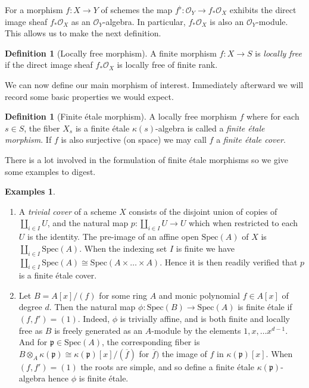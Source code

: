 \documentclass{article}
\theoremstyle{definition}
\newtheorem{definition}[theorem]{Definition}
\newtheorem{examples}[theorem]{Examples}
\theoremstyle{remark}
\theoremstyle{plain}
\newcommand{\mc}[1]{\mathcal{#1}}
\newcommand{\mk}[1]{\mathfrak{#1}}
\begin{document}
For a morphism $f: X \to Y$ of schemes the map $f^{\flat}: \mc{O}_Y \to f_*\mc{O}_X$ exhibits the direct image sheaf $f_* \mc{O}_X$ as an $\mc{O}_Y$-algebra.
In particular, $f_* \mc{O}_X$ is also an $\mc{O}_Y$-module.
This allows us to make the next definition.

\begin{definition}[Locally free morphism]	
	A finite morphism $f: X \to S$ is \textit{locally free} if the direct image sheaf $f_* \mc{O}_X$ is locally free of finite rank.   
\end{definition}

We can now define our main morphism of interest.
Immediately afterward we will record some basic properties we would expect.
\begin{definition}[Finite \'etale morphism]
	A locally free morphism $f$ where for each $s \in S$, the fiber $X_s$ is a finite \'etale $\kappa(s)$-algebra is called a \textit{finite \'etale morphism}.
	If $f$ is also surjective (on space) we may call $f$ a \textit{finite \'etale cover}.
\end{definition}

There is a lot involved in the formulation of finite \'etale morphisms so we give some examples to digest.

\begin{examples}\text{} 
	\begin{enumerate}
\item 	A \textit{trivial cover} of a scheme $X$ consists of the disjoint union of copies of $\coprod_{i \in I} U$, and the natural map $p: \coprod_{i \in I} U \to U$ which when restricted to each $U$ is the identity.
	The pre-image of an affine open $\text{Spec}(A)$ of $X$ is $\coprod_{i \in I} \text{Spec}(A)$.
	When the indexing set $I$ is finite we have $\coprod_{i \in I} \text{Spec}(A) \cong \text{Spec}(A \times \dots \times A)$.
	Hence it is then readily verified that $p$ is a finite \'etale cover.
\item  Let $B = A[x]/(f)$  for some ring $A$ and monic polynomial $f \in A[x]$ of degree $d$.
	Then the natural map $\phi: \text{Spec}(B) \to \text{Spec}(A)$ is finite \'etale if $(f, f') = (1)$.
	Indeed, $\phi$ is trivially affine, and is both finite and locally free as $B$ is freely generated as an $A$-module by the elements $1,x, \dots x^{d-1}$.
	And for $\mk{p} \in \text{Spec}(A)$, the corresponding fiber is $B \otimes_A \kappa(\mk{p}) \cong \kappa(\mk{p})[x]/(\overline{f})$ for $\overline{f})$ the image of $f$ in $\kappa(\mk{p})[x]$.
	When $(f, f') = (1)$ the roots are simple, and so define a finite \'etale $\kappa(\mk{p})$-algebra hence $\phi$ is finite \'etale.
    \end{enumerate}	 
\end{examples}
\end{document}
